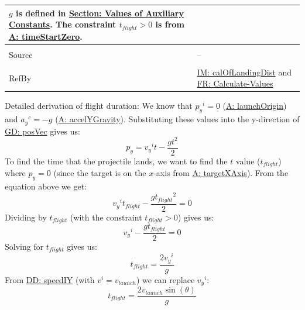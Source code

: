 \documentclass[12pt]{article}
\begin{document}
\begin{minipage}{\textwidth}
\begin{tabular}{>{\raggedright}p{}>{\raggedright\arraybackslash}p{}}
        $g$ is defined in \hyperref[Sec:AuxConstants]{Section: Values of Auxiliary Constants}.
        The constraint ${t_{flight}}>0$ is from \hyperref[timeStartZero]{A: timeStartZero}.
\\ \midrule \\
Source & --
\\ \midrule \\
RefBy & \hyperref[IM:calOfLandingDist]{IM: calOfLandingDist} and \hyperref[calcValues]{FR: Calculate-Values}
\\ \bottomrule
\end{tabular}
\end{minipage}
Detailed derivation of flight duration:
We know that ${{p_{y}}^{i}}=0$ (\hyperref[launchOrigin]{A: launchOrigin}) and ${{a_{y}}^{c}}=-g$ (\hyperref[accelYGravity]{A: accelYGravity}). Substituting these values into the y-direction of \hyperref[GD:posVec]{GD: posVec} gives us:
\begin{displaymath}
{p_{y}}={{v_{y}}^{i}} t-\frac{g t^{2}}{2}
\end{displaymath}
To find the time that the projectile lands, we want to find the $t$ value (${t_{flight}}$) where ${p_{y}}=0$ (since the target is on the $x$-axis from \hyperref[targetXAxis]{A: targetXAxis}). From the equation above we get:
\begin{displaymath}
{{v_{y}}^{i}} {t_{flight}}-\frac{g {t_{flight}}^{2}}{2}=0
\end{displaymath}
Dividing by ${t_{flight}}$ (with the constraint ${t_{flight}}>0$) gives us:
\begin{displaymath}
{{v_{y}}^{i}}-\frac{g {t_{flight}}}{2}=0
\end{displaymath}
Solving for ${t_{flight}}$ gives us:
\begin{displaymath}
{t_{flight}}=\frac{2 {{v_{y}}^{i}}}{g}
\end{displaymath}
From \hyperref[DD:speedIY]{DD: speedIY} (with ${v^{i}}={v_{launch}}$) we can replace ${{v_{y}}^{i}}$:
\begin{displaymath}
{t_{flight}}=\frac{2 {v_{launch}} \sin\left(θ\right)}{g}
\end{displaymath}
\par~
\end{document}
